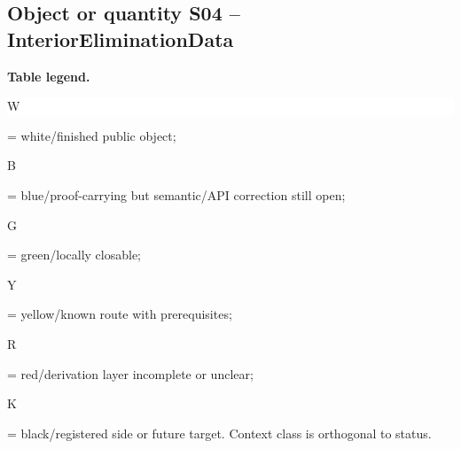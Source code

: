 \subsection*{Object or quantity S04 -- InteriorEliminationData}
\hypertarget{objproof:S04}{}
\par\smallskip\noindent\begin{minipage}{0.99\linewidth}\footnotesize\raggedright\textbf{Table legend.} \colorbox{white}{\strut W} = white/finished public object; \colorbox{cyan!20}{\strut B} = blue/proof-carrying but semantic/API correction still open; \colorbox{green!18}{\strut G} = green/locally closable; \colorbox{yellow!25}{\strut Y} = yellow/known route with prerequisites; \colorbox{red!20}{\strut R} = red/derivation layer incomplete or unclear; \colorbox{black!18}{\strut K} = black/registered side or future target. Context class is orthogonal to status.\end{minipage}\par\vspace{0.25em}
